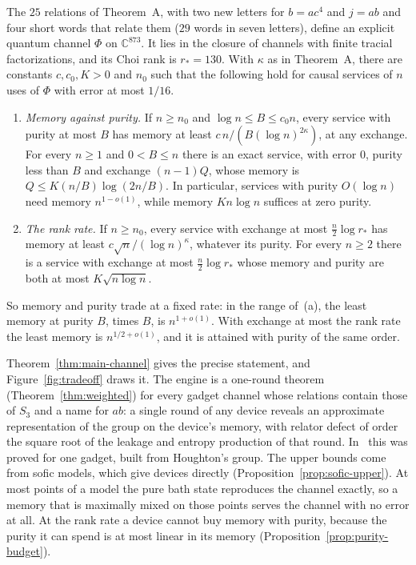 \begin{theoremB}
The $25$ relations of Theorem~A, with two new letters for $b=ac^4$ and $j=ab$ and four short words that relate them ($29$ words in seven
letters), define an explicit quantum channel $\Phi$ on $\mathbb C^{873}$.
It lies in the closure of channels with finite tracial factorizations, and its Choi rank is $r_*=130$. With $\kappa$ as in
Theorem~A, there are constants $c,c_0,K>0$ and $n_0$ such that the following hold for causal services of $n$ uses of $\Phi$ with error at most
$1/16$.
\begin{enumerate}[label=(\alph*),itemsep=1pt]
\item \emph{Memory against purity.} If $n\ge n_0$ and $\log n\le B\le c_0n$, every service with purity at most $B$ has memory at least
$c\,n/(B(\log n)^{2\kappa})$, at any exchange. For every $n\ge1$ and $0<B\le n$ there is an exact service, with error $0$, purity less than
$B$ and exchange $(n-1)Q$, whose memory is $Q\le K(n/B)\log(2n/B)$. In particular, services with purity $O(\log n)$ need memory
$n^{1-o(1)}$, while memory $Kn\log n$ suffices at zero purity.
\item \emph{The rank rate.} If $n\ge n_0$, every service with exchange at most $\frac n2\log r_*$ has memory at least
$c\sqrt n/(\log n)^{\kappa}$, whatever its purity. For every $n\ge2$ there is a service with exchange at most $\frac n2\log r_*$ whose memory
and purity are both at most $K\sqrt{n\log n}$.
\end{enumerate}
So memory and purity trade at a fixed rate: in the range of~(a), the least memory at purity $B$, times $B$, is $n^{1+o(1)}$. With exchange at
most the rank rate the least memory is $n^{1/2+o(1)}$, and it is attained with purity of the same order.
\end{theoremB}

Theorem~\ref{thm:main-channel} gives the precise statement, and Figure~\ref{fig:tradeoff} draws it. The engine is a one-round theorem
(Theorem~\ref{thm:weighted}) for every gadget channel whose relations contain those of $S_3$ and a name for $ab$: a single round of any device
reveals an approximate representation of the group on the device's memory, with relator defect of order the square root of the leakage and
entropy production of that round. In~\cite[Theorem~5.5 and Appendix~B]{DouglasMghirbiB} this was proved for one gadget, built from Houghton's
group. The upper bounds come from sofic models, which give devices directly (Proposition~\ref{prop:sofic-upper}). At most points of a model
the pure bath state reproduces the channel exactly, so a memory that is maximally mixed on those points serves the channel with no error at
all. At the rank rate a device cannot buy memory with purity, because the purity it can spend is at most linear in its memory
(Proposition~\ref{prop:purity-budget}).

